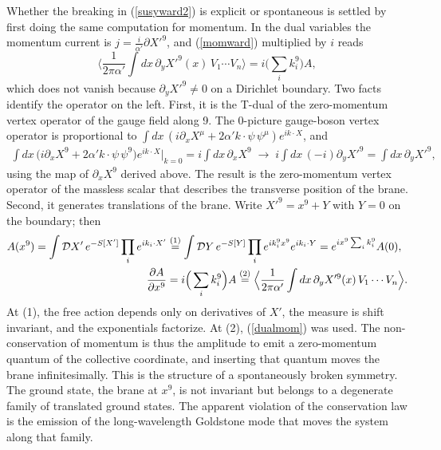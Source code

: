 \begin{tcolorbox}[breakable]
\begin{remark}
Whether the breaking in (\ref{susyward2}) is explicit or spontaneous is settled by first doing the same computation for momentum. In the dual variables the momentum current is $j = \frac{i}{\alpha'}\partial X'^9$, and (\ref{momward}) multiplied by $i$ reads
\begin{equation}
\Big\langle \frac{1}{2\pi\alpha'}\int dx\,\partial_y X'^9(x)\,V_1\cdots V_n\Big\rangle = i\Big(\sum_i k_i^9\Big)A ,
\tag{D.9}\label{dualmom}
\end{equation}
which does not vanish because $\partial_yX'^9\ne0$ on a Dirichlet boundary. Two facts identify the operator on the left. First, it is the T-dual of the zero-momentum vertex operator of the gauge field along 9. The 0-picture gauge-boson vertex operator is proportional to $\int dx\,(i\partial_xX^\mu + 2\alpha'k\cdot\psi\,\psi^\mu)e^{ik\cdot X}$, and
\begin{align*}
\int dx\,\big(i\partial_xX^9 + 2\alpha'k\cdot\psi\,\psi^9\big)e^{ik\cdot X}\Big|_{k=0}
= i\int dx\,\partial_xX^9 \;\to\; i\int dx\,(-i)\partial_yX'^9 = \int dx\,\partial_yX'^9 ,
\end{align*}
using the map of $\partial_xX^9$ derived above. The result is the zero-momentum vertex operator of the massless scalar that describes the transverse position of the brane. Second, it generates translations of the brane. Write $X'^9 = x^9 + Y$ with $Y=0$ on the boundary; then
\begin{align*}
A(x^9) = \int\mathcal DX'\,e^{-S[X']}\prod_i e^{ik_i\cdot X'}
&\overset{(1)}{=} \int\mathcal DY\,e^{-S[Y]}\prod_i e^{ik_i^9x^9}e^{ik_i\cdot Y} = e^{ix^9\sum_ik_i^9}A(0), \\
\frac{\partial A}{\partial x^9} &= i\Big(\sum_ik_i^9\Big)A \overset{(2)}{=} \Big\langle\frac{1}{2\pi\alpha'}\int dx\,\partial_yX'^9(x)\,V_1\cdots V_n\Big\rangle .
\end{align*}
At (1), the free action depends only on derivatives of $X'$, the measure is shift invariant, and the exponentials factorize. At (2), (\ref{dualmom}) was used. The non-conservation of momentum is thus the amplitude to emit a zero-momentum quantum of the collective coordinate, and inserting that quantum moves the brane infinitesimally. This is the structure of a spontaneously broken symmetry. The ground state, the brane at $x^9$, is not invariant but belongs to a degenerate family of translated ground states. The apparent violation of the conservation law is the emission of the long-wavelength Goldstone mode that moves the system along that family.


\end{remark}
\end{tcolorbox}

